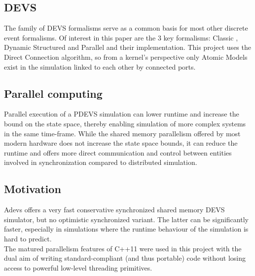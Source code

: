 \subsection{DEVS}
The family of DEVS \cite{DEVSbase} formalisms serve as a common basis for most other discrete event formalisms. Of interest in this paper are the 3 key formalisms: Classic \cite{ClassicDEVS}, Dynamic Structured \cite{DSDEVS} and Parallel \cite{ParallelDEVS} and their implementation. This project uses the Direct Connection \cite{SymbolicFlattening} algorithm, so from a kernel's perspective only Atomic Models exist in the simulation linked to each other by connected ports.

\subsection{Parallel computing}
Parallel execution of a PDEVS simulation can lower runtime and increase the bound on the state space, thereby enabling simulation of more complex systems in the same time-frame.
While the shared memory parallelism offered by most modern hardware does not increase the state space bounds, it can reduce the runtime and offers more direct communication and control between entities involved in synchronization compared to distributed simulation. \\

\subsection{Motivation}
Adevs \cite{adevs} offers a very fast conservative synchronized shared memory DEVS simulator, but no optimistic synchronized variant. 
The latter can be significantly faster, especially in simulations where the runtime behaviour of the simulation is hard to predict. \\
The matured parallelism features of C++11 were used in this project with the dual aim of writing standard-compliant (and thus portable) code without losing access to powerful low-level threading primitives. %

